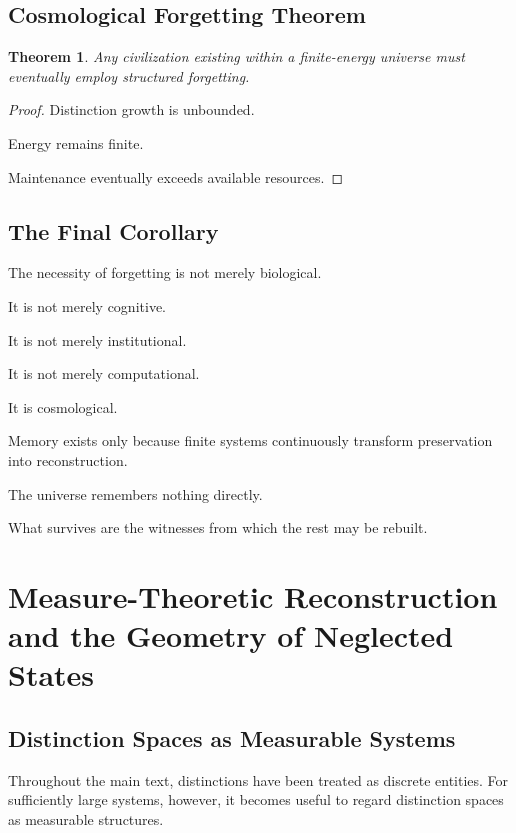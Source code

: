 \documentclass[12pt,oneside]{book}
\theoremstyle{plain} \newtheorem{theorem}{Theorem}[chapter] \newtheorem{lemma}[theorem]{Lemma} \newtheorem{proposition}[theorem]{Proposition} \newtheorem{corollary}[theorem]{Corollary}
\theoremstyle{definition} \newtheorem{definition}[theorem]{Definition} \newtheorem{axiom}[theorem]{Axiom} \newtheorem{construction}[theorem]{Construction}
\theoremstyle{remark} \newtheorem{remark}[theorem]{Remark} \newtheorem{example}[theorem]{Example}
\begin{document}
\section{Cosmological Forgetting Theorem}

\begin{theorem}

Any civilization existing within a finite-energy universe must eventually employ structured forgetting.

\end{theorem}

\begin{proof}

Distinction growth is unbounded.

Energy remains finite.

Maintenance eventually exceeds available resources.

\end{proof}

\section{The Final Corollary}

The necessity of forgetting is not merely biological.

It is not merely cognitive.

It is not merely institutional.

It is not merely computational.

It is cosmological.

Memory exists only because finite systems continuously transform preservation into reconstruction.

The universe remembers nothing directly.

What survives are the witnesses from which the rest may be rebuilt.

\chapter{Measure-Theoretic Reconstruction and the Geometry of Neglected States}

\section{Distinction Spaces as Measurable Systems}

Throughout the main text, distinctions have been treated as discrete entities. For sufficiently large systems, however, it becomes useful to regard distinction spaces as measurable structures.
\end{document}

